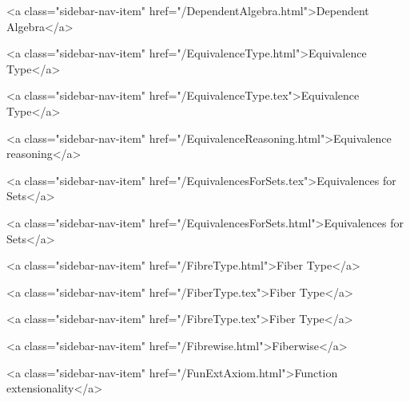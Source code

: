       
        
          <a class="sidebar-nav-item" href="/DependentAlgebra.html">Dependent Algebra</a>
        
      
    
      
        
          <a class="sidebar-nav-item" href="/EquivalenceType.html">Equivalence Type</a>
        
      
    
      
        
          <a class="sidebar-nav-item" href="/EquivalenceType.tex">Equivalence Type</a>
        
      
    
      
        
          <a class="sidebar-nav-item" href="/EquivalenceReasoning.html">Equivalence reasoning</a>
        
      
    
      
        
          <a class="sidebar-nav-item" href="/EquivalencesForSets.tex">Equivalences for Sets</a>
        
      
    
      
        
          <a class="sidebar-nav-item" href="/EquivalencesForSets.html">Equivalences for Sets</a>
        
      
    
      
        
          <a class="sidebar-nav-item" href="/FibreType.html">Fiber Type</a>
        
      
    
      
        
          <a class="sidebar-nav-item" href="/FiberType.tex">Fiber Type</a>
        
      
    
      
        
          <a class="sidebar-nav-item" href="/FibreType.tex">Fiber Type</a>
        
      
    
      
        
          <a class="sidebar-nav-item" href="/Fibrewise.html">Fiberwise</a>
        
      
    
      
        
          <a class="sidebar-nav-item" href="/FunExtAxiom.html">Function extensionality</a>
        
